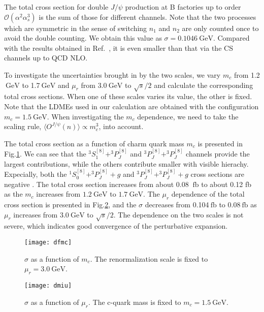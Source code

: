 \documentclass[preprint,showpacs,preprintnumbers,amssymb,aps]{revtex4}
\def\gev{\mathrm{~GeV}}
\def\fb{\mathrm{~fb}}
\begin{document}
The total cross section for double $J/\psi$ production at B factories up to order $\mathcal{O}(\alpha^2\alpha_s^3)$ is the sum of those for different channels.
Note that the two processes which are symmetric in the sense of switching $n_1$ and $n_2$ are only counted once to avoid the double counting.
We obtain this value as $\sigma=0.1046\gev$.
Compared with the results obtained in Ref.~\cite{Gong:2008ce},
it is even smaller than that via the CS channels up to QCD NLO.

To investigate the uncertainties brought in by the two scales,
we vary $m_c$ from 1.2$\gev$ to 1.7$\gev$ and $\mu_r$ from $3.0\gev$ to $\sqrt{s}/2$ and calculate the corresponding total cross sections.
When one of these scales varies its value, the other is fixed.
Note that the LDMEs used in our calculation are obtained with the configuration $m_c=1.5\gev$.
When investigating the $m_c$ dependence, we need to take the scaling rule, $\langle O^{J/\psi}(n)\rangle\propto m_c^3$, into account.

The total cross section as a function of charm quark mass $m_c$ is presented in Fig.\ref{fig:fmc}.
We can see that the $^3S_1^{[8]}+^3P_J^{[8]}$ and $^3P_J^{[8]}+^3P_J^{[8]}$ channels provide the largest contributions,
while the others contribute smaller with visible hierachy. 
Expecially, both the $^1S_0^{[8]}+^3P_J^{[8]}+g$ and $^3P_J^{[8]}+^3P_J^{[8]} + g$ cross sections are negative .
The total cross section increases from about 0.08 $\fb$ to about 0.12 fb as the $m_c$ increases from $1.2\gev$ to $1.7\gev$.
The $\mu_r$ dependence of the total cross section is presented in Fig.\ref{fig:miu},
and the $\sigma$ decreases from 0.104$\fb$ to 0.08$\fb$ as $\mu_r$ increases from $3.0\gev$ to $\sqrt{s}/2$.
The dependence on the two scales is not severe, which indicates good convergence of the perturbative expansion.

\begin{figure}[!ht]
 \begin{center}
 \texttt{[image: dfmc]}
 \end{center}
 \caption{$\sigma$ as a function of $m_c$. The renormalization scale is fixed to $\mu_r=3.0\gev$.}
 \label{fig:fmc}
\end{figure}

\begin{figure}[!ht]
 \begin{center}
 \texttt{[image: dmiu]}
 \end{center}
 \caption{$\sigma$ as a function of $\mu_r$. The c-quark mass is fixed to $m_c=1.5\gev$.}
 \label{fig:miu}
\end{figure}
\end{document}

